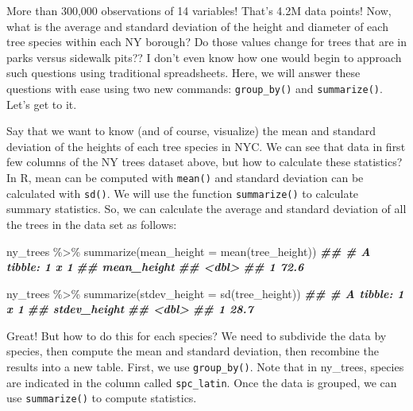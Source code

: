 \documentclass[
]{krantz}
\newenvironment{Shaded}{\begin{snugshade}}{\end{snugshade}}
\newcommand{\AttributeTok}[1]{\textcolor[rgb]{0.77,0.63,0.00}{#1}}
\newcommand{\DocumentationTok}[1]{\textcolor[rgb]{0.56,0.35,0.01}{\textbf{\textit{#1}}}}
\newcommand{\FunctionTok}[1]{\textcolor[rgb]{0.00,0.00,0.00}{#1}}
\newcommand{\NormalTok}[1]{#1}
\newcommand{\SpecialCharTok}[1]{\textcolor[rgb]{0.00,0.00,0.00}{#1}}
\begin{document}
More than 300,000 observations of 14 variables! That's 4.2M data points! Now, what is the average and standard deviation of the height and diameter of each tree species within each NY borough? Do those values change for trees that are in parks versus sidewalk pits?? I don't even know how one would begin to approach such questions using traditional spreadsheets. Here, we will answer these questions with ease using two new commands: \texttt{group\_by()} and \texttt{summarize()}. Let's get to it.

Say that we want to know (and of course, visualize) the mean and standard deviation of the heights of each tree species in NYC. We can see that data in first few columns of the NY trees dataset above, but how to calculate these statistics? In R, mean can be computed with \texttt{mean()} and standard deviation can be calculated with \texttt{sd()}. We will use the function \texttt{summarize()} to calculate summary statistics. So, we can calculate the average and standard deviation of all the trees in the data set as follows:

\begin{Shaded}
\begin{Highlighting}[]
\NormalTok{ny\_trees }\SpecialCharTok{\%\textgreater{}\%}
  \FunctionTok{summarize}\NormalTok{(}\AttributeTok{mean\_height =} \FunctionTok{mean}\NormalTok{(tree\_height))}
\DocumentationTok{\#\# \# A tibble: 1 x 1}
\DocumentationTok{\#\#   mean\_height}
\DocumentationTok{\#\#         \textless{}dbl\textgreater{}}
\DocumentationTok{\#\# 1        72.6}

\NormalTok{ny\_trees }\SpecialCharTok{\%\textgreater{}\%}
  \FunctionTok{summarize}\NormalTok{(}\AttributeTok{stdev\_height =} \FunctionTok{sd}\NormalTok{(tree\_height))}
\DocumentationTok{\#\# \# A tibble: 1 x 1}
\DocumentationTok{\#\#   stdev\_height}
\DocumentationTok{\#\#          \textless{}dbl\textgreater{}}
\DocumentationTok{\#\# 1         28.7}
\end{Highlighting}
\end{Shaded}

Great! But how to do this for each species? We need to subdivide the data by species, then compute the mean and standard deviation, then recombine the results into a new table. First, we use \texttt{group\_by()}. Note that in ny\_trees, species are indicated in the column called \texttt{spc\_latin}. Once the data is grouped, we can use \texttt{summarize()} to compute statistics.
\end{document}
